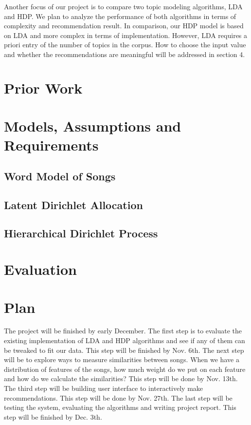 \documentclass[10pt,twocolumn,letterpaper]{article}
\begin{document}
   \par
   Another focus of our project is to compare two topic modeling algorithms, LDA and HDP. We plan to analyze the performance of both algorithms in terms of complexity and recommendation result. In comparison, our HDP model is based on LDA and more complex in terms of implementation. However, LDA requires a priori entry of the number of topics in the corpus. How to choose the input value and whether the recommendations are meaningful will be addressed in section 4.


\section{Prior Work}

\section{Models, Assumptions and Requirements}

\subsection{Word Model of Songs}
\subsection{Latent Dirichlet Allocation}
\subsection{Hierarchical Dirichlet Process}

\section{Evaluation}

\section{Plan}
The project will be finished by early December. The first step is to evaluate the existing implementation of LDA and HDP algorithms and see if any of them can be tweaked to fit our data. This step will be finished by Nov. 6th. The next step will be to explore ways to measure similarities between songs. When we have a distribution of features of the songs, how much weight do we put on each feature and how do we calculate the similarities? This step will be done by Nov. 13th. The third step will be building user interface to interactively make recommendations. This step will be done by Nov. 27th. The last step will be testing the system, evaluating the algorithms and writing project report. This step will be finished by Dec. 3th.

{\small


}
\end{document}
